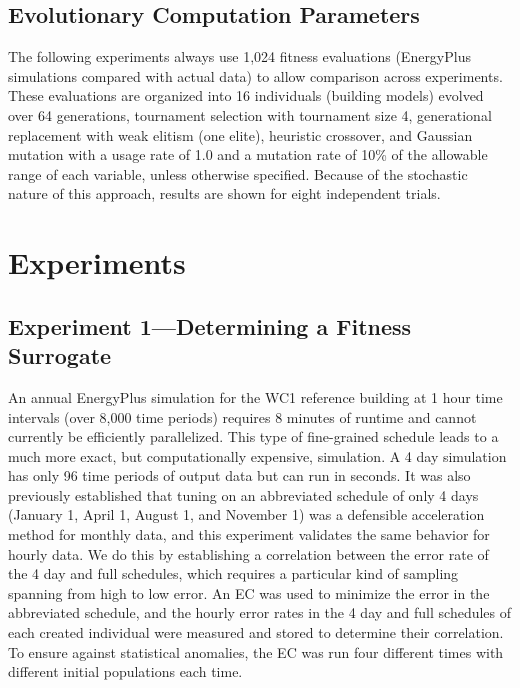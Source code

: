 \documentclass[preprint, review, 12pt]{elsarticle}
\begin{document}
\subsection{Evolutionary Computation Parameters}
The following experiments always use 1,024 fitness evaluations (EnergyPlus simulations compared with actual data) to allow comparison across experiments. These evaluations are organized into 16 individuals (building models) evolved over 64 generations, tournament selection with tournament size 4, generational replacement with weak elitism (one elite), heuristic crossover, and Gaussian mutation with a usage rate of 1.0 and a mutation rate of 10\% of the allowable range of each variable, unless otherwise specified. Because of the stochastic nature of this approach, results are shown for eight independent trials.



\section{Experiments}
\label{sec:hourly}

\subsection{Experiment 1---Determining a Fitness Surrogate}
\label{sub:experiment1}
An annual EnergyPlus simulation for the WC1 reference building at 1 hour time intervals (over 8,000 time periods) requires 8 minutes of runtime and cannot currently be efficiently parallelized. This type of fine-grained schedule leads to a much more exact, but computationally expensive, simulation. A 4 day simulation has only 96 time periods of output data but can run in seconds. It was also previously established \cite{cit:garrett2013} that tuning on an abbreviated schedule of only 4 days (January 1, April 1, August 1, and November 1) was a defensible acceleration method for monthly data, and this experiment validates the same behavior for hourly data. We do this by establishing a correlation between the error rate of the 4 day and full schedules, which requires a particular kind of sampling spanning from high to low error. An EC was used to minimize the error in the abbreviated schedule, and the hourly error rates in the 4 day and full schedules of each created individual were measured and stored to determine their correlation. To ensure against statistical anomalies, the EC was run four different times with different initial populations each time.
\end{document}
